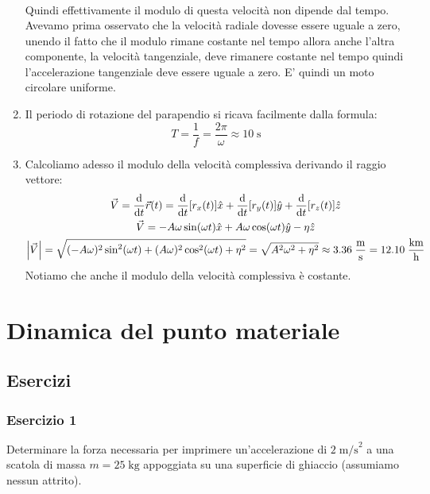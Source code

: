 \documentclass[12pt,a4paper]{book}
\begin{document}
\begin{enumerate}[label=\alph*)]
\begin{gather*}
\end{gather*}
%
Quindi effettivamente il modulo di questa velocità non dipende dal tempo. Avevamo prima osservato che la velocità radiale dovesse essere uguale a zero, unendo il fatto che il modulo rimane costante nel tempo allora anche l'altra componente, la velocità tangenziale, deve rimanere costante nel tempo quindi l'accelerazione tangenziale deve essere uguale a zero. E' quindi un moto circolare uniforme.
\item Il periodo di rotazione del parapendio si ricava facilmente dalla formula:
%
\begin{equation*}
T=\frac{1}{f}=\frac{2\pi}{\omega}\approx 10\;\text{s}
\end{equation*}
%
\item Calcoliamo adesso il modulo della velocità complessiva derivando il raggio vettore:
%
\begin{gather*}
\vec{V}=\dv{t}\vec{r}(t)=\dv{t}[r_x(t)]\hat{x}+\dv{t}[r_y(t)]\hat{y}+\dv{t}[r_z(t)]\hat{z} \\
\vec{V}=-A\omega\sin(\omega t)\hat{x}+A\omega\cos(\omega t)\hat{y}-\eta\hat{z}\\
\qty|\vec{V}|=\sqrt{(-A\omega)^2\sin^2(\omega t)+(A\omega)^2\cos^2(\omega t)+\eta^2}=\sqrt{A^2\omega^2+\eta^2}\approx 3.36\;\frac{\text{m}}{\text{s}}=12.10\;\frac{\text{km}}{\text{h}}
\end{gather*}
%
Notiamo che anche il modulo della velocità complessiva è costante.
\end{enumerate}

\chapter{Dinamica del punto materiale}

\graphicspath{{./figure/4/}}


\section{Esercizi}

\subsection*{Esercizio 1}
Determinare la forza necessaria per imprimere un'accelerazione di $2\;\text{m/s}^2$ a una scatola di massa $m=25\;\text{kg}$ appoggiata su una superficie di ghiaccio (assumiamo nessun attrito).
\end{document}
